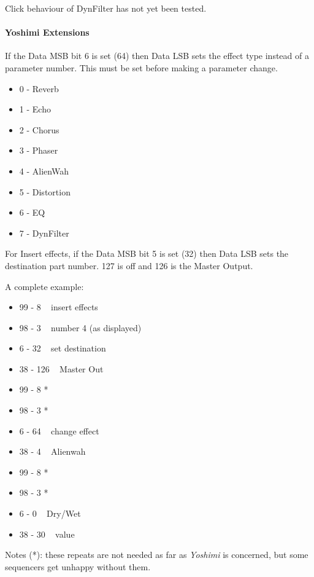    Click behaviour of DynFilter has not yet been tested.

\paragraph{Yoshimi Extensions}

   If the Data MSB bit 6 is set (64) then Data LSB sets the effect type
   instead of a parameter number.  This must be set before making a parameter
   change.

   \begin{itemize}
      \item 0 - Reverb
      \item 1 - Echo
      \item 2 - Chorus
      \item 3 - Phaser
      \item 4 - AlienWah
      \item 5 - Distortion
      \item 6 - EQ
      \item 7 - DynFilter
   \end{itemize}

   For Insert effects, if the Data MSB bit 5 is set (32) then Data LSB sets
   the destination part number. 127 is off and 126 is the Master Output.

   A complete example:

   \begin{itemize}
      \item 99 -   8 ~ insert effects
      \item 98 -   3 ~ number 4 (as displayed)
      \item 6 -  32 ~ set destination
      \item 38 - 126 ~ Master Out
      \item 99 -   8  *
      \item 98 -   3  *
      \item 6 -  64 ~ change effect
      \item 38 -   4 ~ Alienwah
      \item 99 -   8  *
      \item 98 -   3  *
      \item 6 -   0 ~ Dry/Wet
      \item 38 -  30 ~ value
   \end{itemize}

   Notes (*): these repeats are not needed as far as \textsl{Yoshimi}
   is concerned, but some sequencers get unhappy without them.

